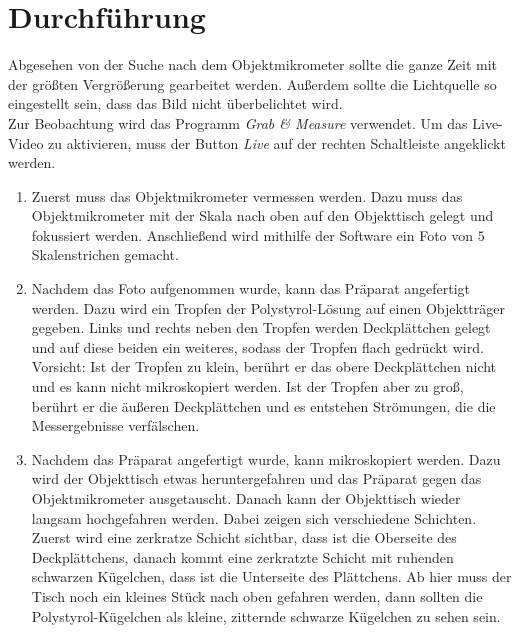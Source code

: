 \section*{Durchführung}

Abgesehen von der Suche nach dem Objektmikrometer sollte die ganze Zeit mit der größten Vergrößerung gearbeitet werden. Außerdem sollte die Lichtquelle so eingestellt sein, dass das Bild nicht überbelichtet wird. \\
Zur Beobachtung wird das Programm \emph{Grab \& Measure} verwendet. Um das Live-Video zu aktivieren, muss der Button \emph{Live} auf der rechten Schaltleiste angeklickt werden.
\begin{enumerate}

  \item Zuerst muss das Objektmikrometer vermessen werden. Dazu muss das Objektmikrometer mit der Skala nach oben auf den Objekttisch gelegt und fokussiert werden. Anschließend wird mithilfe der Software ein Foto von $5$ Skalenstrichen gemacht.

  \item Nachdem das Foto aufgenommen wurde, kann das Präparat angefertigt werden. Dazu wird ein Tropfen der Polystyrol-Lösung auf einen Objektträger gegeben. Links und rechts neben den Tropfen werden Deckplättchen gelegt und auf diese beiden ein weiteres, sodass der Tropfen flach gedrückt wird. Vorsicht: Ist der Tropfen zu klein, berührt er das obere Deckplättchen nicht und es kann nicht mikroskopiert werden. Ist der Tropfen aber zu groß, berührt er die äußeren Deckplättchen und es entstehen Strömungen, die die Messergebnisse verfälschen.

  \item Nachdem das Präparat angefertigt wurde, kann mikroskopiert werden. Dazu wird der Objekttisch etwas heruntergefahren und das Präparat gegen das Objektmikrometer ausgetauscht. Danach kann der Objekttisch wieder langsam hochgefahren werden. Dabei zeigen sich verschiedene Schichten. Zuerst wird eine zerkratze Schicht sichtbar, dass ist die Oberseite des Deckplättchens, danach kommt eine zerkratzte Schicht mit ruhenden schwarzen Kügelchen, dass ist die Unterseite des Plättchens. Ab hier muss der Tisch noch ein kleines Stück nach oben gefahren werden, dann sollten die Polystyrol-Kügelchen als kleine, zitternde schwarze Kügelchen zu sehen sein.


\end{enumerate}
